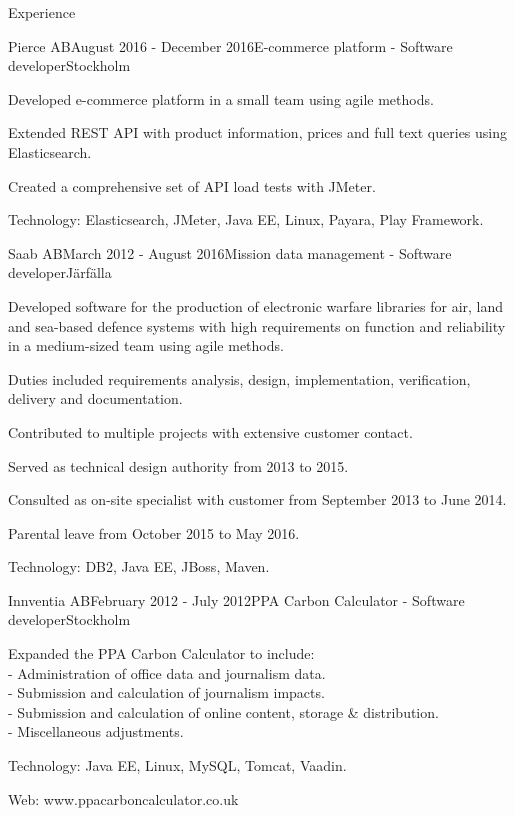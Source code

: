 \documentclass{resume}
\begin{document}
\begin{rSection}{Experience}
    \begin{rSubsection}{Pierce AB}{August 2016 - December 2016}{E-commerce platform - Software developer}{Stockholm}
      \item Developed e-commerce platform in a small team using agile methods.
      \item Extended REST API with product information, prices and full text queries using Elasticsearch.
      \item Created a comprehensive set of API load tests with JMeter.
      \item Technology: Elasticsearch, JMeter, Java EE, Linux, Payara, Play Framework.
    \end{rSubsection}

    \begin{rSubsection}{Saab AB}{March 2012 - August 2016}{Mission data management - Software developer}{Järfälla}
      \item Developed software for the production of electronic warfare libraries for air, land and sea-based defence systems with high requirements on function and reliability in a medium-sized team using agile methods.
      \item Duties included requirements analysis, design, implementation, verification, delivery and documentation.
      \item Contributed to multiple projects with extensive customer contact.
      \item Served as technical design authority from 2013 to 2015.
      \item Consulted as on-site specialist with customer from September 2013 to June 2014.
      \item Parental leave from October 2015 to May 2016.
      \item Technology: DB2, Java EE, JBoss, Maven.
    \end{rSubsection}

    \begin{rSubsection}{Innventia AB}{February 2012 - July 2012}{PPA Carbon Calculator - Software developer}{Stockholm}
      \item Expanded the PPA Carbon Calculator to include:\\
      - Administration of office data and journalism data. \\
      - Submission and calculation of journalism impacts.\\
      - Submission and calculation of online content, storage \& distribution.\\
      - Miscellaneous adjustments.
      \item Technology: Java EE, Linux, MySQL, Tomcat, Vaadin.
      \item Web: www.ppacarboncalculator.co.uk
    \end{rSubsection}


\end{rSection}
\end{document}
